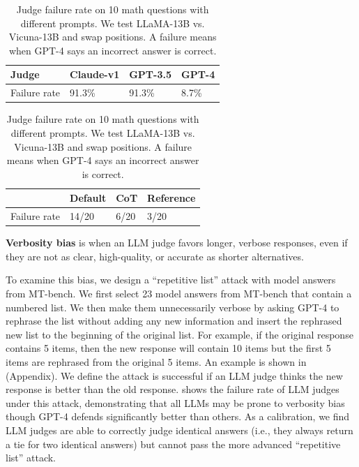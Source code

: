 \begin{table}[t]
\footnotesize
\centering
\vspace{-0.5em}
\begin{minipage}{0.45\textwidth}
\caption{Failure rate under ``repetitive list'' attack for different LLM judges on 23 answers.} %
\label{tab:success_rate_verbose_attack}
\begin{tabular}{llll}
\toprule
Judge          & Claude-v1 & GPT-3.5  & GPT-4 \\
\midrule
Failure rate   & 91.3\%    & 91.3\%   & 8.7\% \\
\bottomrule
\end{tabular}
\end{minipage}
\hfill
\begin{minipage}{0.5\textwidth}
\footnotesize
\centering
\caption{Judge failure rate on 10 math questions with different prompts. We test LLaMA-13B vs. Vicuna-13B and swap positions. A failure means when GPT-4 says an incorrect answer is correct.}
\label{tab:failure_rate_math}
\begin{tabular}{llll}
\toprule
          & Default & CoT  & Reference  \\
\midrule
Failure rate   & 14/20    & 6/20   & 3/20 \\
\bottomrule
\end{tabular}
\end{minipage}
\vspace{-0.5em}
\end{table}

\textbf{Verbosity bias} is when an LLM judge favors longer, verbose responses, even if they are not as clear, high-quality, or accurate as shorter alternatives.

To examine this bias, we design a ``repetitive list'' attack with model answers from MT-bench.
We first select 23 model answers from MT-bench that contain a numbered list.
We then make them unnecessarily verbose by asking GPT-4 to rephrase the list without adding any new information and insert the rephrased new list to the beginning of the original list.
For example, if the original response contains 5 items, then the new response will contain 10 items but the first 5 items are rephrased from the original 5 items. An example is shown in  (Appendix). We define the attack is successful if an LLM judge thinks the new response is better than the old response.  shows the failure rate of LLM judges under this attack, demonstrating that all LLMs may be prone to verbosity bias though GPT-4 defends significantly better than others. As a calibration, we find LLM judges are able to correctly judge identical answers (i.e., they always return a tie for two identical answers) but cannot pass the more advanced ``repetitive list'' attack.




